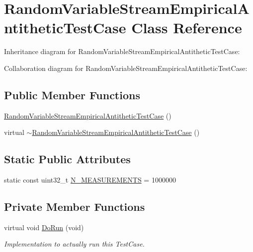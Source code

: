 \hypertarget{classRandomVariableStreamEmpiricalAntitheticTestCase}{}\section{Random\+Variable\+Stream\+Empirical\+Antithetic\+Test\+Case Class Reference}
\label{classRandomVariableStreamEmpiricalAntitheticTestCase}


Inheritance diagram for Random\+Variable\+Stream\+Empirical\+Antithetic\+Test\+Case\+:


Collaboration diagram for Random\+Variable\+Stream\+Empirical\+Antithetic\+Test\+Case\+:
\subsection*{Public Member Functions}
\begin{DoxyCompactItemize}
\item 
\hyperlink{classRandomVariableStreamEmpiricalAntitheticTestCase_aed389148fd52b1afd4384cd834ba4ace}{Random\+Variable\+Stream\+Empirical\+Antithetic\+Test\+Case} ()
\item 
virtual \hyperlink{classRandomVariableStreamEmpiricalAntitheticTestCase_a8983f298930c08e38ce74e82f4edee7e}{$\sim$\+Random\+Variable\+Stream\+Empirical\+Antithetic\+Test\+Case} ()
\end{DoxyCompactItemize}
\subsection*{Static Public Attributes}
\begin{DoxyCompactItemize}
\item 
static const uint32\+\_\+t \hyperlink{classRandomVariableStreamEmpiricalAntitheticTestCase_ad11d56c364b966694fdf0c339dfa4f72}{N\+\_\+\+M\+E\+A\+S\+U\+R\+E\+M\+E\+N\+TS} = 1000000
\end{DoxyCompactItemize}
\subsection*{Private Member Functions}
\begin{DoxyCompactItemize}
\item 
virtual void \hyperlink{classRandomVariableStreamEmpiricalAntitheticTestCase_aff8e13cf80352999319d7600e2324d26}{Do\+Run} (void)
\begin{DoxyCompactList}\small\item\em Implementation to actually run this Test\+Case. \end{DoxyCompactList}\end{DoxyCompactItemize}
